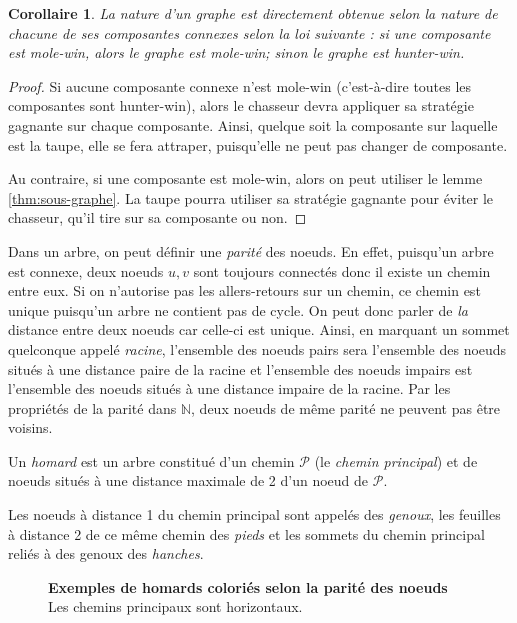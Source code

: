 \documentclass[12pt]{article}
\newtheorem{corollaire}[theoreme]{Corollaire}
\newcommand{\N}{\mathbb{N}}
\renewcommand{\P}{\mathcal{P}}
\newcommand{\cad}{c'est-à-dire\xspace}
\begin{document}
\begin{corollaire}\label{thm:composante-connexe}
    La nature d'un graphe est directement obtenue selon la nature de chacune de ses composantes connexes selon la loi suivante : si une composante est mole-win, alors le graphe est mole-win; sinon le graphe est hunter-win.
\end{corollaire}

\begin{proof}
Si aucune composante connexe n'est mole-win (\cad toutes les composantes sont hunter-win), alors le chasseur devra appliquer sa stratégie gagnante sur chaque composante. Ainsi, quelque soit la composante sur laquelle est la taupe, elle se fera attraper, puisqu'elle ne peut pas changer de composante.

Au contraire, si une composante est mole-win, alors on peut utiliser le lemme \ref{thm:sous-graphe}. La taupe pourra utiliser sa stratégie gagnante pour éviter le chasseur, qu'il tire sur sa composante ou non.
\end{proof}

Dans un arbre, on peut définir une \emph{parité} des noeuds. En effet, puisqu'un arbre est connexe, deux noeuds $u,v$ sont toujours connectés donc il existe un chemin entre eux. Si on n'autorise pas les allers-retours sur un chemin, ce chemin est unique puisqu'un arbre ne contient pas de cycle. On peut donc parler de \emph{la} distance entre deux noeuds car celle-ci est unique. Ainsi, en marquant un sommet quelconque appelé \emph{racine}, l'ensemble des noeuds pairs sera l'ensemble des noeuds situés à une distance paire de la racine et l'ensemble des noeuds impairs est l'ensemble des noeuds situés à une distance impaire de la racine. Par les propriétés de la parité dans $\N$, deux noeuds de même parité ne peuvent pas être voisins.

Un \emph{homard} est un arbre constitué d'un chemin $\P$ (le \emph{chemin principal}) et de noeuds situés à une distance maximale de 2 d'un noeud de $\P$.

Les noeuds à distance 1 du chemin principal sont appelés des \emph{genoux}, les feuilles à distance 2 de ce même chemin des \emph{pieds} et les sommets du chemin principal reliés à des genoux des \emph{hanches}.

\begin{figure}[h!]
    \centering
     \quad\quad
    
    \caption{\textbf{Exemples de homards coloriés selon la parité des noeuds} Les chemins principaux sont horizontaux.}
    \label{fig:lobster}
\end{figure}
\end{document}
